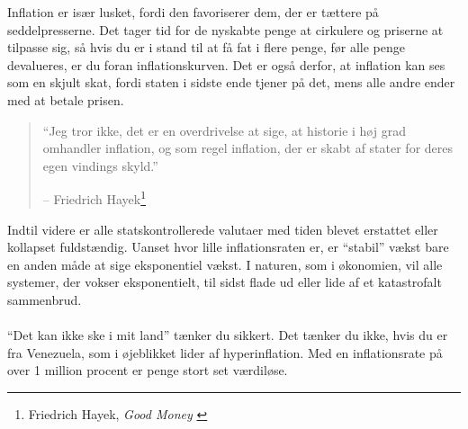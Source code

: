 \documentclass[paper=6in:9in,pagesize=pdftex,
               headinclude=on,footinclude=on,12pt]{scrbook}
\begin{document}
Inflation er især lusket, fordi den favoriserer dem, der er tættere på seddelpresserne. Det tager tid for de nyskabte penge at cirkulere og priserne at tilpasse sig, så hvis du er i stand til at få fat i flere penge, før alle penge devalueres, er du foran inflationskurven. Det er også derfor, at inflation kan ses som en skjult skat, fordi staten i sidste ende tjener på det, mens alle andre ender med at betale prisen.\begin{quotation}\begin{samepage} \enquote{Jeg tror ikke, det er en overdrivelse at sige, at historie i høj grad omhandler inflation, og som regel inflation, der er skabt af stater for deres egen vindings skyld.} \begin{flushright} -- Friedrich Hayek\footnote{Friedrich Hayek, \textit{Good Money} \cite{hayek-good-money}}
\end{flushright}\end{samepage}\end{quotation}

\newpage

Indtil videre er alle statskontrollerede valutaer med tiden blevet erstattet eller kollapset fuldstændig. Uanset hvor lille inflationsraten er, er \enquote{stabil} vækst bare en anden måde at sige eksponentiel vækst. I naturen, som i økonomien, vil alle systemer, der vokser eksponentielt, til sidst flade ud eller lide af et katastrofalt sammenbrud.\paragraph{} \enquote{Det kan ikke ske i mit land} tænker du sikkert. Det tænker du ikke, hvis du er fra Venezuela, som i øjeblikket lider af hyperinflation. Med en inflationsrate på over 1 million procent er penge stort set værdiløse. \cite{wiki:venezuela}
\end{document}

